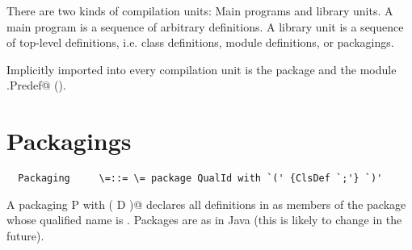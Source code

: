 \documentclass[11pt]{report}
\newcommand{\ifpackaging}[1]{}
\begin{document}
\begin{itemize}
There are two kinds of compilation units: Main programs and library
units. A main program is a sequence of arbitrary definitions. A
library unit is a sequence of top-level definitions, i.e. class
definitions, module definitions, or packagings.

Implicitly imported into every compilation unit is the package
\verb@scala@ and the module \verb@scala.Predef@ ().

\section{Packagings}

\syntax\begin{verbatim}
  Packaging     \=::= \= package QualId with `(' {ClsDef `;'} `)'
\end{verbatim}

A packaging \verb@package P with ( D )@ declares all definitions in
\verb@D@ as members of the package whose qualified name is
\verb@P@. Packages are as in Java (this is likely to change in the
future).
\ifpackaging{
Packagings augment top-level modules and classes. A simple packaging
$$\PACKAGE;id;\WITH;mi_1;\ldots;\WITH;mi_n;\WITH;(stats)$$ augments the
template of the top-level module or class named $id$ with new mixin
classes and with new member definitions.

The static effect of such a packaging can be expressed as a
source-to-source tranformation which adds $mi_1 \commadots mi_n$ to
the mixin classes of $id$, and which adds the definitions in $stats$
to the statement part of $id$'s template.  Each type $mi_j$ must refer
to an interface type and $stats$ must consists only of pure and local
definitions.  The augmented template and any class that extends it
must be well-formed.  The aditional definitions may not overwrite
definitions of the augmented template, and they may not access private
members of it.

Several packagings can be applied to the same top-level definition,
and those packagings may reside in different compilation units.

A qualified packaging $\PACKAGE;Q.id;\WITH;t$ is equivalent to the
nested packagings
\begin{verbatim}
package $Q$ with {
  package $id$ with $t$
}
\end{verbatim}

A packaging with type parameters $\PACKAGE;c[tps];\WITH;...$ applies to
a parameterized class $c$. The number of type parameters must equal
the number of type parameters of $c$, and every bound in $tps$ must
conform to the corresponding bound in the original definition of $c$.

}
\end{itemize}
\end{document}
